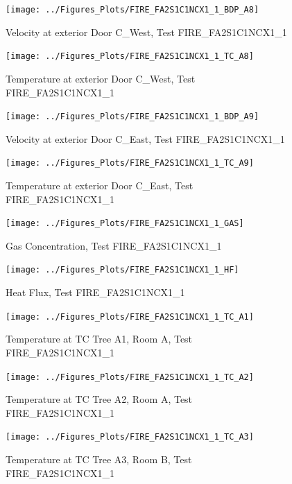 \documentclass[11pt,oneside]{book}
\begin{document}
\begin{figure}[!ht]
\texttt{[image: ../Figures\_Plots/FIRE\_FA2S1C1NCX1\_1\_BDP\_A8]}
\caption{Velocity at exterior Door C\_West, Test FIRE\_FA2S1C1NCX1\_1}
\label{fig:FIRE_FA2S1C1NCX1_1_BDP_A8}
\end{figure}

\begin{figure}[!ht]
\texttt{[image: ../Figures\_Plots/FIRE\_FA2S1C1NCX1\_1\_TC\_A8]}
\caption{Temperature at exterior Door C\_West, Test FIRE\_FA2S1C1NCX1\_1}
\label{fig:FIRE_FA2S1C1NCX1_1_TC_A8}
\end{figure}

\begin{figure}[!ht]
\texttt{[image: ../Figures\_Plots/FIRE\_FA2S1C1NCX1\_1\_BDP\_A9]}
\caption{Velocity at exterior Door C\_East, Test FIRE\_FA2S1C1NCX1\_1}
\label{fig:FIRE_FA2S1C1NCX1_1_BDP_A9}
\end{figure}

\begin{figure}[!ht]
\texttt{[image: ../Figures\_Plots/FIRE\_FA2S1C1NCX1\_1\_TC\_A9]}
\caption{Temperature at exterior Door C\_East, Test FIRE\_FA2S1C1NCX1\_1}
\label{fig:FIRE_FA2S1C1NCX1_1_TC_A9}
\end{figure}

\begin{figure}[!ht]
\texttt{[image: ../Figures\_Plots/FIRE\_FA2S1C1NCX1\_1\_GAS]}
\caption{Gas Concentration, Test FIRE\_FA2S1C1NCX1\_1}
\label{fig:FIRE_FA2S1C1NCX1_1_GAS}
\end{figure}

\begin{figure}[!ht]
\texttt{[image: ../Figures\_Plots/FIRE\_FA2S1C1NCX1\_1\_HF]}
\caption{Heat Flux, Test FIRE\_FA2S1C1NCX1\_1}
\label{fig:FIRE_FA2S1C1NCX1_1_HF}
\end{figure}

\begin{figure}[!ht]
\texttt{[image: ../Figures\_Plots/FIRE\_FA2S1C1NCX1\_1\_TC\_A1]}
\caption{Temperature at TC Tree A1, Room A, Test FIRE\_FA2S1C1NCX1\_1}
\label{fig:FIRE_FA2S1C1NCX1_1_TC_A1}
\end{figure}

\begin{figure}[!ht]
\texttt{[image: ../Figures\_Plots/FIRE\_FA2S1C1NCX1\_1\_TC\_A2]}
\caption{Temperature at TC Tree A2, Room A, Test FIRE\_FA2S1C1NCX1\_1}
\label{fig:FIRE_FA2S1C1NCX1_1_TC_A2}
\end{figure}

\begin{figure}[!ht]
\texttt{[image: ../Figures\_Plots/FIRE\_FA2S1C1NCX1\_1\_TC\_A3]}
\caption{Temperature at TC Tree A3, Room B, Test FIRE\_FA2S1C1NCX1\_1}
\label{fig:FIRE_FA2S1C1NCX1_1_TC_A3}
\end{figure}
\end{document}
